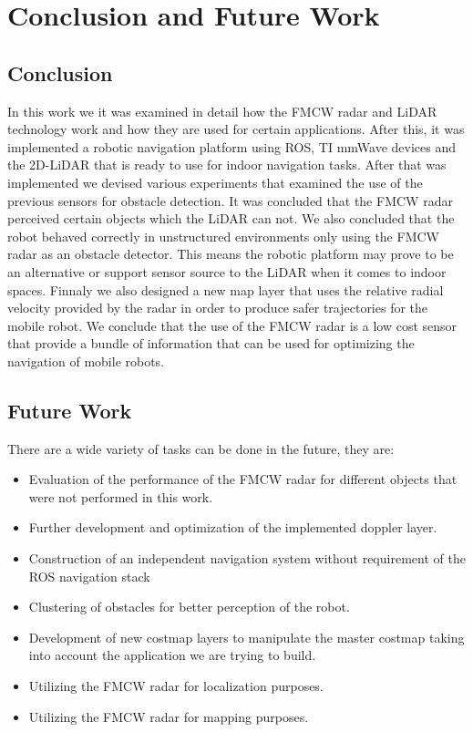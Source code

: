 \chapter{Conclusion and Future Work}


\section{Conclusion}
In this work we it was examined in detail how the \ac{FMCW} \ac{radar} and \ac{LiDAR} technology work and how they are used for certain applications. After this, it was implemented a robotic navigation platform using \ac{ROS}, \ac{TI} \ac{mmWave} devices and the 2D-\ac{LiDAR} that is ready to use for indoor navigation tasks. After that was implemented we devised various experiments that examined the use of the previous sensors for obstacle detection. It was concluded that the \ac{FMCW} \ac{radar} perceived certain objects which the \ac{LiDAR} can not. We also concluded that the robot behaved correctly in unstructured environments only using the \ac{FMCW} \ac{radar} as an obstacle detector. This means the robotic platform may prove to be an alternative or support sensor source to the \ac{LiDAR} when it comes to indoor spaces. Finnaly we also designed a new map layer that uses the relative radial velocity provided by the \ac{radar} in order to produce safer trajectories for the mobile robot. We conclude that the use of the \ac{FMCW} \ac{radar} is a low cost sensor that provide a bundle of information that can be used for optimizing the navigation of mobile robots.
\section{Future Work}
There are a wide variety of tasks can be done in the future, they are:
\begin{itemize}
    \item Evaluation of the performance of the \ac{FMCW} \ac{radar} for different objects that were not performed in this work.
    \item Further development and optimization of the implemented doppler layer.
    \item Construction of an independent navigation system without requirement of the \ac{ROS} navigation stack
    \item Clustering of obstacles for better perception of the robot.
    \item Development of new costmap layers to manipulate the master costmap taking into account the application we are trying to build.
    \item Utilizing the \ac{FMCW} \ac{radar} for localization purposes.
    \item Utilizing the \ac{FMCW} \ac{radar} for mapping  purposes.
\end{itemize}

